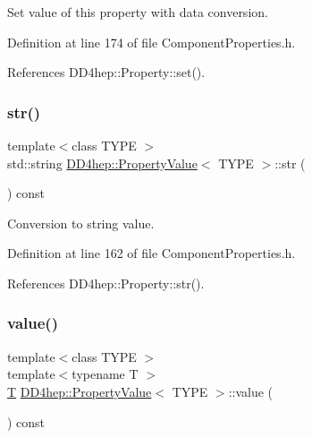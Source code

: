 Set value of this property with data conversion. 



Definition at line 174 of file Component\+Properties.\+h.



References D\+D4hep\+::\+Property\+::set().

\hypertarget{class_d_d4hep_1_1_property_value_a956c6ca4ee9db4f237a109bac38e44d1}{}\label{class_d_d4hep_1_1_property_value_a956c6ca4ee9db4f237a109bac38e44d1} 
\subsubsection{\texorpdfstring{str()}{str()}}
{\footnotesize\ttfamily template$<$class T\+Y\+PE $>$ \\
std\+::string \hyperlink{class_d_d4hep_1_1_property_value}{D\+D4hep\+::\+Property\+Value}$<$ T\+Y\+PE $>$\+::str (\begin{DoxyParamCaption}{ }\end{DoxyParamCaption}) const\hspace{0.3cm}{\ttfamily [inline]}}



Conversion to string value. 



Definition at line 162 of file Component\+Properties.\+h.



References D\+D4hep\+::\+Property\+::str().

\hypertarget{class_d_d4hep_1_1_property_value_ab9c4701e14767a3a8e20658ddde2d8eb}{}\label{class_d_d4hep_1_1_property_value_ab9c4701e14767a3a8e20658ddde2d8eb} 
\subsubsection{\texorpdfstring{value()}{value()}\hspace{0.1cm}{\footnotesize\ttfamily [1/2]}}
{\footnotesize\ttfamily template$<$class T\+Y\+PE $>$ \\
template$<$typename T $>$ \\
\hyperlink{class_t}{T} \hyperlink{class_d_d4hep_1_1_property_value}{D\+D4hep\+::\+Property\+Value}$<$ T\+Y\+PE $>$\+::value (\begin{DoxyParamCaption}{ }\end{DoxyParamCaption}) const\hspace{0.3cm}{\ttfamily [inline]}}



